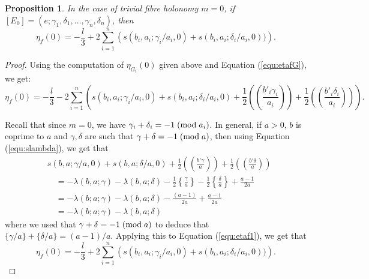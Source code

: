 \documentclass{amsart}
\newtheorem{proposition}[theorem]{Proposition}
\theoremstyle{definition}
\theoremstyle{remark}
\numberwithin{equation}{section}
\begin{document}
\begin{proposition}
In the case of trivial fibre holonomy $m = 0$, if $[E_0] = (e ; \gamma_1 , \delta_1 , \dots , \gamma_n , \delta_n)$, then
\[
\eta_f(0) = -\frac{l}{3} + 2\sum_{i=1}^{n} \left( s(b_i,a_i;\gamma_i/a_i,0) + s(b_i,a_i;\delta_i/a_i , 0)) \right).
\]
\end{proposition}
\begin{proof}
Using the computation of $\eta_{G_i}(0)$ given above and Equation (\ref{equ:etafG}), we get:
\begin{equation}\label{equ:etaf1}
\eta_f(0) = -\frac{l}{3} - 2\sum_{i=1}^{n} \left( s(b_i,a_i;\gamma_i/a_i,0) + s(b_i,a_i;\delta_i/a_i , 0) + \frac{1}{2} \left( \! \left( \frac{b'_i \gamma_i}{a_i} \right) \! \right) + \frac{1}{2} \left(\! \left( \frac{b'_i \delta_i}{a_i} \right) \! \right) \right).
\end{equation}

Recall that since $m=0$, we have $\gamma_i + \delta_i = -1 \; ({\rm mod} \; a_i)$. In general, if $a > 0$, $b$ is coprime to $a$ and $\gamma,\delta$ are such that $\gamma + \delta = -1 \; ({\rm mod} \; a)$, then using Equation (\ref{equ:slambda}), we get that 
\begin{align*}
&s(b,a;\gamma/a,0) + s(b,a;\delta/a,0) + \frac{1}{2} \left(\! \left( \frac{b'\gamma}{a} \right) \! \right) + \frac{1}{2} \left( \! \left( \frac{b'\delta}{a} \right) \! \right) \\
& \quad = -\lambda(b,a;\gamma) - \lambda(b,a;\delta) - \frac{1}{2} \left\{ \frac{\gamma}{a} \right\} - \frac{1}{2} \left\{ \frac{\delta}{a} \right\} + \frac{a-1}{2a} \\
& \quad = -\lambda(b;a;\gamma) - \lambda(b,a;\delta) - \frac{(a-1)}{2a} + \frac{a-1}{2a} \\
& \quad = -\lambda(b;a;\gamma) - \lambda(b,a;\delta)
\end{align*}
where we used that $\gamma + \delta = -1 \; ({\rm mod} \; a)$ to deduce that $\{ \gamma/a \} + \{\delta/a\} = (a-1)/a$. Applying this to Equation (\ref{equ:etaf1}), we get that
\[
\eta_f(0) = -\frac{l}{3} + 2\sum_{i=1}^{n} \left( s(b_i,a_i;\gamma_i/a_i,0) + s(b_i,a_i;\delta_i/a_i , 0)) \right).
\]
\end{proof}
\end{document}
